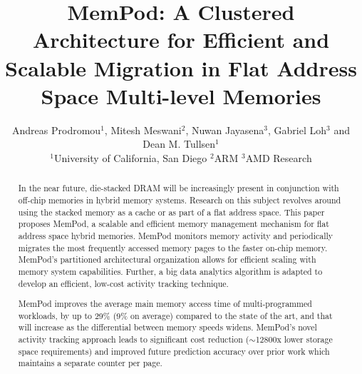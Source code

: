 \documentclass{sig-alternate}
\title {\vspace{-1em}MemPod: A Clustered Architecture for Efficient and Scalable Migration in Flat Address Space Multi-level Memories}
\author{\vspace{-4em}Andreas Prodromou$^1$, Mitesh Meswani$^2$, Nuwan Jayasena$^3$, Gabriel Loh$^3$ and Dean M. Tullsen$^1$\vspace{-1em}\\$^1$University of California, San Diego \quad $^2$ARM \quad $^3$AMD Research}
\begin{document}
\maketitle
\pagestyle{plain}

\begin{abstract}

%

In the near future, die-stacked DRAM will be increasingly
present in conjunction with 
off-chip memories in hybrid memory systems. Research on this subject revolves around using the stacked memory as a cache or as part of a flat address space. This paper proposes MemPod, a scalable and efficient memory management mechanism for flat address space hybrid memories. MemPod monitors memory activity and periodically migrates the most frequently accessed memory pages to the faster on-chip memory. MemPod's partitioned architectural organization allows for efficient scaling with memory system capabilities. Further, a big data analytics algorithm is adapted to develop an efficient, low-cost activity tracking technique. 

MemPod improves the average main memory access time of multi-programmed workloads, by up to 29\% (9\% on average) compared to the state of the art, and that will increase as the differential between memory speeds widens.
MemPod's novel activity tracking approach leads to significant cost reduction ($\sim$12800x lower storage space requirements) and improved future prediction accuracy over prior work which maintains a separate counter per page.

\end{abstract}
\end{document}
